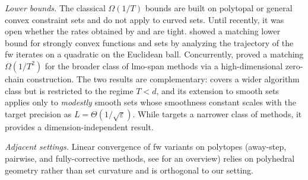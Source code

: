 \documentclass{article}
\newcommand{\bigomega}[1]{\Omega( #1 )}
\begin{document}
\emph{Lower bounds.}
The classical $\bigomega{1/T}$ bounds \citep{canon1968tight,lan2013complexity} are built on polytopal or general convex constraint sets and do not apply to curved sets.
Until recently, it was open whether the rates obtained by \citet{garber15faster} and \citet{kerdreux2021projection} are tight.
\citet{halbey2026lower} showed a matching lower bound for strongly convex functions and sets by analyzing the trajectory of the \gls{fw} iterates on a quadratic on the Euclidean ball.
Concurrently, \citet{grimmer2026uniform} proved a matching $\bigomega{1/T^2}$ for the broader class of \gls{lmo}-span methods via a high-dimensional zero-chain construction.
The two results are complementary: \citet{grimmer2026uniform} covers a wider algorithm class but is restricted to the regime $T<d$, and its extension to smooth sets applies only to \emph{modestly} smooth sets whose smoothness constant scales with the target precision as $L=\Theta(1/\sqrt{\varepsilon})$.
While \citet{halbey2026lower} targets a narrower class of methods, it provides a dimension-independent result. 

\emph{Adjacent settings.}
Linear convergence of \gls{fw} variants on polytopes (away-step, pairwise, and fully-corrective methods, see \citet{braun2025conditional} for an overview) relies on polyhedral geometry rather than set curvature and is orthogonal to our setting. 
\end{document}

